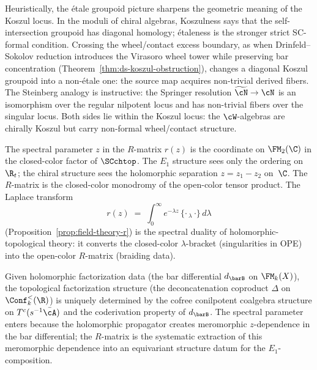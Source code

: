 \begin{remark}
\label{rem:etale-dichotomy}
Heuristically, the étale groupoid picture sharpens the geometric
meaning of the Koszul locus. In the moduli of chiral algebras,
Koszulness says that the self-intersection groupoid has diagonal
homology; étaleness is the stronger strict SC-formal condition.
Crossing the wheel/contact excess boundary, as when
Drinfeld--Sokolov reduction introduces the Virasoro wheel tower while
preserving bar concentration
(Theorem~\ref{thm:ds-koszul-obstruction}), changes a diagonal
Koszul groupoid into a non-étale one: the source map acquires
non-trivial derived fibers. The Steinberg analogy is instructive: the
Springer resolution $\widetilde{\cN} \to \cN$ is an isomorphism over
the regular nilpotent locus and has non-trivial fibers over the
singular locus. Both sides lie within the Koszul locus: the
$\cW$-algebras are chirally Koszul but carry non-formal wheel/contact
structure.
\end{remark}

\begin{remark}
\label{rem:spectral-parameter-operadic}
The spectral parameter $z$ in the $R$-matrix $r(z)$ is the
coordinate on $\FM_2(\C)$ in the closed-color factor of
$\SCchtop$. The $E_1$ structure sees only the ordering on
$\R_t$; the chiral structure sees the holomorphic separation
$z = z_1 - z_2$ on~$\C$. The $R$-matrix is the closed-color
monodromy of the open-color tensor product. The Laplace
transform
\[
r(z)
\;=\;
\int_0^\infty e^{-\lambda z}\,
\{\cdot\,{}_\lambda\,\cdot\}\, d\lambda
\]
(Proposition~\ref{prop:field-theory-r}) is the spectral duality
of holomorphic-topological theory: it converts the closed-color
$\lambda$-bracket (singularities in OPE) into the open-color
$R$-matrix (braiding data).
\end{remark}

\begin{proposition}
\label{prop:two-color-canonicity}
Given holomorphic factorization data (the bar differential
$d_{\barB}$ on $\FM_k(X)$), the topological factorization
structure (the deconcatenation coproduct $\Delta$ on
$\Conf_k^{<}(\R)$) is uniquely determined by the cofree
conilpotent coalgebra structure on $T^c(s^{-1}\bar{\cA})$
and the coderivation property of $d_{\barB}$. The spectral parameter enters
because the holomorphic propagator creates meromorphic
$z$-dependence in the bar differential; the $R$-matrix is
the systematic extraction of this meromorphic dependence into
an equivariant structure datum for the $E_1$-composition.
\end{proposition}

